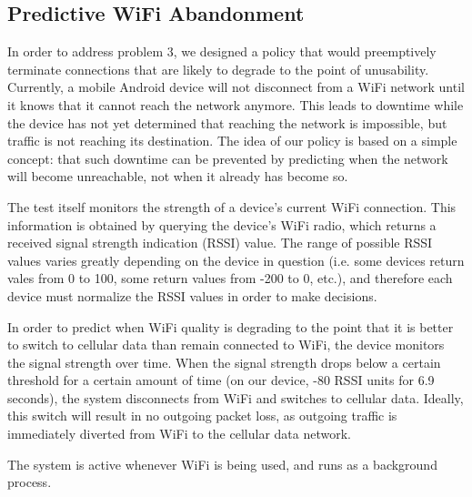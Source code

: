\subsection{Predictive WiFi Abandonment}
In order to address problem 3, we designed a policy that would preemptively terminate connections that are likely to degrade to the point of unusability. Currently, a mobile Android device will not disconnect from a WiFi network until it knows that it cannot reach the network anymore. This leads to downtime while the device has not yet determined that reaching the network is impossible, but traffic is not reaching its destination. The idea of our policy is based on a simple concept: that such downtime can be prevented by predicting when the network will become unreachable, not when it already has become so.

The test itself monitors the strength of a device's current WiFi connection. This information is obtained by querying the device's WiFi radio, which returns a received signal strength indication (RSSI) value. The range of possible RSSI values varies greatly depending on the device in question (i.e. some devices return vales from 0 to 100, some return values from -200 to 0, etc.), and therefore each device must normalize the RSSI values in order to make decisions.

In order to predict when WiFi quality is degrading to the point that it is better to switch to cellular data than remain connected to WiFi, the device monitors the signal strength over time. When the signal strength drops below a certain threshold for a certain amount of time (on our device, -80 RSSI units for 6.9 seconds), the system disconnects from WiFi and switches to cellular data. Ideally, this switch will result in no outgoing packet loss, as outgoing traffic is immediately diverted from WiFi to the cellular data network.

The system is active whenever WiFi is being used, and runs as a background process.